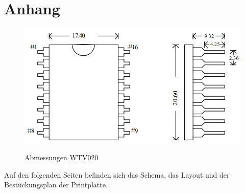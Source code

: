 \chapter{Anhang}
\thispagestyle{fancy}  
\begin{figure}[h]
\centering
\includegraphics[scale=0.5]{Bilder/footprint_wtv020.png}
\label{fig:irgendesBild}
\caption[Abmessungen WTV020]{Abmessungen WTV020}
\end{figure}

Auf den folgenden Seiten befinden sich das Schema, das Layout und der Bestückungsplan der Printplatte.


\label{pdf:SchemaSpannungsversorgung}


\label{pdf:SchemaUSB}


\label{pdf:SchemaMikrocontroller}


\label{pdf:BestueckungTop}


\label{pdf:BestueckungBottom}


\label{pdf:LayoutAll}


\label{pdf:LayoutTop}


\label{pdf:LayoutBottom}